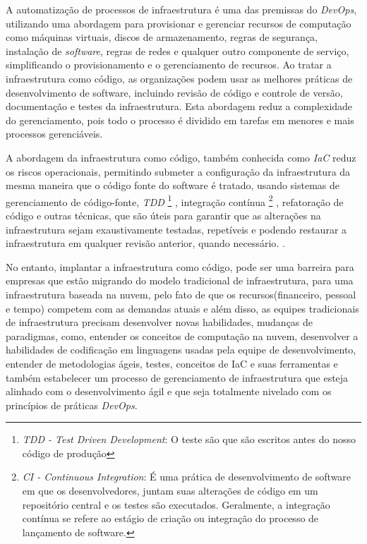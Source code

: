 A automatização de processos de infraestrutura é uma das premissas do \textit{DevOps}, utilizando uma abordagem para provisionar e gerenciar recursos de computação como máquinas virtuais, discos de armazenamento, regras de segurança, instalação de \textit{software}, regras de redes e qualquer outro componente de serviço, simplificando o provisionamento e o gerenciamento de recursos. Ao tratar a infraestrutura como código, as organizações podem usar as melhores práticas de desenvolvimento de software, incluindo revisão de código e controle de versão, documentação e testes da infraestrutura. Esta abordagem reduz a complexidade do gerenciamento, pois todo o processo é dividido em tarefas em menores e mais processos gerenciáveis.

A abordagem da infraestrutura como código, também conhecida como \textit{IaC} reduz os riscos operacionais, permitindo submeter a configuração da infraestrutura da mesma maneira que o código fonte do software é tratado, usando sistemas de gerenciamento de código-fonte, \textit{TDD} \footnote{\textit{TDD - Test Driven Development}: O teste são que são escritos antes do nosso código de produção} , integração contínua \footnote{\textit{CI - Continuous Integration}: É uma prática de desenvolvimento de software em que os desenvolvedores, juntam suas alterações de código em um repositório central e os testes são executados. Geralmente, a integração contínua se refere ao estágio de criação ou integração do processo de lançamento de software.} , refatoração de código e outras técnicas, que são úteis para garantir que as alterações na infraestrutura sejam exaustivamente testadas, repetíveis e podendo restaurar a infraestrutura em qualquer revisão anterior, quando necessário. \cite{Morris:2016:ICM:3006361}.


No entanto, implantar a infraestrutura como código, pode ser uma barreira para empresas que estão migrando do modelo tradicional de infraestrutura, para uma infraestrutura baseada na nuvem, pelo fato de que os recursos(financeiro, pessoal e tempo) competem com as demandas atuais e além disso, as equipes tradicionais de infraestrutura precisam desenvolver novas habilidades, mudanças de paradigmas, como, entender os conceitos de computação na nuvem, desenvolver a habilidades de codificação em linguagens usadas pela equipe de desenvolvimento, entender de metodologias ágeis, testes, conceitos de IaC e suas ferramentas e também estabelecer um processo de gerenciamento de infraestrutura que esteja alinhado com o desenvolvimento ágil e que seja totalmente nivelado com os princípios de práticas \textit{DevOps}. 


